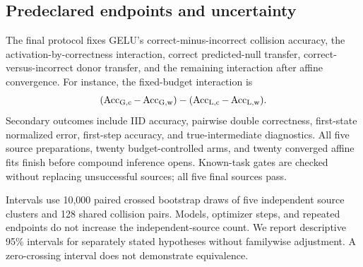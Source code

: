 \subsection{Predeclared endpoints and uncertainty}
The final protocol fixes GELU's correct-minus-incorrect collision accuracy,
the activation-by-correctness interaction, correct predicted-null transfer,
correct-versus-incorrect donor transfer, and the remaining interaction after affine convergence.
For instance, the fixed-budget interaction is
\[
 (\operatorname{Acc}_{\mathrm{G,c}}-\operatorname{Acc}_{\mathrm{G,w}})
 -(\operatorname{Acc}_{\mathrm{L,c}}-\operatorname{Acc}_{\mathrm{L,w}}).
\]
Secondary outcomes include IID accuracy, pairwise double correctness, first-state normalized error, first-step accuracy, and true-intermediate diagnostics.
All five source preparations, twenty budget-controlled arms, and twenty converged affine fits finish before compound inference opens.
Known-task gates are checked without replacing unsuccessful sources; all five final sources pass.

Intervals use 10,000 paired crossed bootstrap draws of five independent source clusters and 128 shared collision pairs. Models, optimizer steps, and repeated endpoints do not increase the independent-source count. We report descriptive 95\% intervals for separately stated hypotheses without familywise adjustment. A zero-crossing interval does not demonstrate equivalence.
